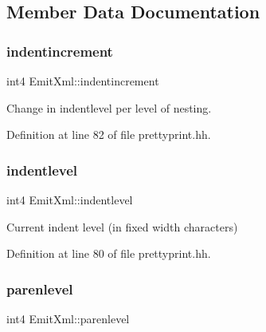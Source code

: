 \subsection{Member Data Documentation}
\mbox{\label{class_emit_xml_ad7b8e7e8c38bd2588fdfab16d18569f4}} 
\subsubsection{\texorpdfstring{indentincrement}{indentincrement}}
{\footnotesize\ttfamily int4 Emit\+Xml\+::indentincrement\hspace{0.3cm}{\ttfamily [protected]}}



Change in indentlevel per level of nesting. 



Definition at line 82 of file prettyprint.\+hh.

\mbox{\label{class_emit_xml_abf74600f6797a26565f5a1e45eadaee2}} 
\subsubsection{\texorpdfstring{indentlevel}{indentlevel}}
{\footnotesize\ttfamily int4 Emit\+Xml\+::indentlevel\hspace{0.3cm}{\ttfamily [protected]}}



Current indent level (in fixed width characters) 



Definition at line 80 of file prettyprint.\+hh.

\mbox{\label{class_emit_xml_a00ec9002c83214ef6d43441ddaf4fc78}} 
\subsubsection{\texorpdfstring{parenlevel}{parenlevel}}
{\footnotesize\ttfamily int4 Emit\+Xml\+::parenlevel\hspace{0.3cm}{\ttfamily [protected]}}




